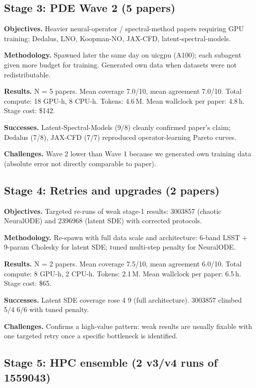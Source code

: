 \documentclass[11pt,letterpaper]{article}
\begin{document}
\subsection{Stage 3: PDE Wave 2 (5 papers)}

\textbf{Objectives.} Heavier neural-operator / spectral-method papers requiring GPU training: Dedalus, LNO, Koopman-NO, JAX-CFD, latent-spectral-models.

\textbf{Methodology.} Spawned later the same day on uicgpu (A100); each subagent given more budget for training. Generated own data when datasets were not redistributable.

\textbf{Results.} N = 5 papers. Mean coverage 7.0/10, mean agreement 7.0/10. Total compute: 18 GPU-h, 8 CPU-h. Tokens: 4.6\,M. Mean wallclock per paper: 4.8\,h. Stage cost: \$142.

\textbf{Successes.} Latent-Spectral-Models (9/8) cleanly confirmed paper's claim; Dedalus (7/8), JAX-CFD (7/7) reproduced operator-learning Pareto curves.

\textbf{Challenges.} Wave 2 lower than Wave 1 because we generated own training data (absolute error not directly comparable to paper).

\subsection{Stage 4: Retries and upgrades (2 papers)}

\textbf{Objectives.} Targeted re-runs of weak stage-1 results: 3003857 (chaotic NeuralODE) and 2396968 (latent SDE) with corrected protocols.

\textbf{Methodology.} Re-spawn with full data scale and architecture: 6-band LSST + 9-param Cholesky for latent SDE; tuned multi-step penalty for NeuralODE.

\textbf{Results.} N = 2 papers. Mean coverage 7.5/10, mean agreement 6.0/10. Total compute: 8 GPU-h, 2 CPU-h. Tokens: 2.1\,M. Mean wallclock per paper: 6.5\,h. Stage cost: \$65.

\textbf{Successes.} Latent SDE coverage rose 4 \textrightarrow{} 9 (full architecture). 3003857 climbed 5/4 \textrightarrow{} 6/6 with tuned penalty.

\textbf{Challenges.} Confirms a high-value pattern: weak results are usually fixable with one targeted retry once a specific bottleneck is identified.

\subsection{Stage 5: HPC ensemble (2 v3/v4 runs of 1559043)}
\end{document}
